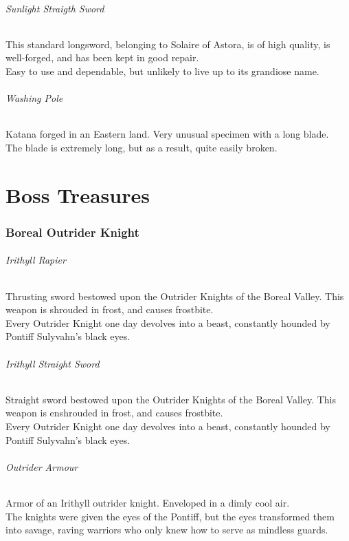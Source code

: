 \documentclass[twocolumn,a4paper]{article}
\begin{document}
\paragraph{Sunlight Straigth Sword}
This standard longsword, belonging to Solaire of Astora, is of high quality, is well-forged, and has been kept in good repair.\\
Easy to use and dependable, but unlikely to live up to its grandiose name.
\paragraph{Washing Pole}
Katana forged in an Eastern land. Very unusual specimen with a long blade.\\
The blade is extremely long, but as a result, quite easily broken.

\newpage
\part{Boss Treasures}
\section*{Boreal Outrider Knight}
\paragraph{Irithyll Rapier}
Thrusting sword bestowed upon the Outrider Knights of the Boreal Valley. This weapon is shrouded in frost, and causes frostbite.\\
Every Outrider Knight one day devolves into a beast, constantly hounded by Pontiff Sulyvahn's black eyes.
\paragraph{Irithyll Straight Sword}
Straight sword bestowed upon the Outrider Knights of the Boreal Valley. This weapon is enshrouded in frost, and causes frostbite.\\
Every Outrider Knight one day devolves into a beast, constantly hounded by Pontiff Sulyvahn's black eyes.
\paragraph{Outrider Armour}
Armor of an Irithyll outrider knight.
Enveloped in a dimly cool air.\\
The knights were given the eyes of the Pontiff, but the eyes transformed them into savage, raving warriors who only knew how to serve as mindless guards.
\end{document}
